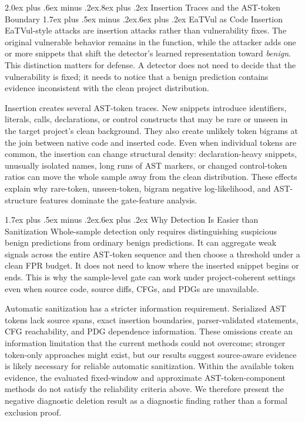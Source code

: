 \documentclass[letterpaper,twocolumn,10pt,twoside]{article}
\makeatletter
\renewcommand\section{\@startsection{section}{1}{\z@}%
  {2.0ex plus .6ex minus .2ex}{.8ex plus .2ex}%
  {\normalfont\large\bfseries}}
\renewcommand\subsection{\@startsection{subsection}{2}{\z@}%
  {1.7ex plus .5ex minus .2ex}{.6ex plus .2ex}%
  {\normalfont\normalsize\bfseries}}
\newcommand{\gate}{sample-level gate}
\makeatother
\begin{document}
\section{Insertion Traces and the AST-token Boundary}
\subsection{EaTVul as Code Insertion}
EaTVul-style attacks are insertion attacks rather than vulnerability fixes. The original vulnerable behavior remains in the function, while the attacker adds one or more snippets that shift the detector's learned representation toward \textit{benign}. This distinction matters for defense. A detector does not need to decide that the vulnerability is fixed; it needs to notice that a benign prediction contains evidence inconsistent with the clean project distribution.

Insertion creates several AST-token traces. New snippets introduce identifiers, literals, calls, declarations, or control constructs that may be rare or unseen in the target project's clean background. They also create unlikely token bigrams at the join between native code and inserted code. Even when individual tokens are common, the insertion can change structural density: declaration-heavy snippets, unusually isolated names, long runs of AST markers, or changed control-token ratios can move the whole sample away from the clean distribution. These effects explain why rare-token, unseen-token, bigram negative log-likelihood, and AST-structure features dominate the gate-feature analysis.

\subsection{Why Detection Is Easier than Sanitization}
Whole-sample detection only requires distinguishing suspicious benign predictions from ordinary benign predictions. It can aggregate weak signals across the entire AST-token sequence and then choose a threshold under a clean FPR budget. It does not need to know where the inserted snippet begins or ends. This is why the \gate{} can work under project-coherent settings even when source code, source diffs, CFGs, and PDGs are unavailable.

Automatic sanitization has a stricter information requirement. Serialized AST tokens lack source spans, exact insertion boundaries, parser-validated statements, CFG reachability, and PDG dependence information. These omissions create an information limitation that the current methods could not overcome; stronger token-only approaches might exist, but our results suggest source-aware evidence is likely necessary for reliable automatic sanitization. Within the available token evidence, the evaluated fixed-window and approximate AST-token-component methods do not satisfy the reliability criteria above. We therefore present the negative diagnostic deletion result as a diagnostic finding rather than a formal exclusion proof.
\end{document}
